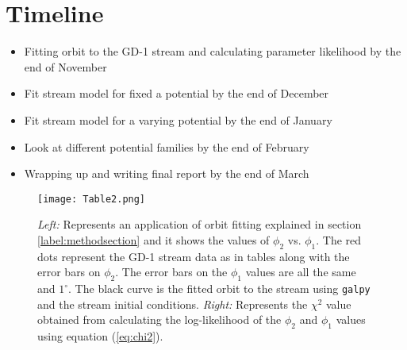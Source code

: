 \documentclass[preprint]{aastex}
\begin{document}
\section{Timeline}
\begin{itemize}
\item Fitting orbit to the GD-1 stream and calculating parameter likelihood by the end of November
\item Fit stream model for fixed a potential by the end of December
\item Fit stream model for a varying potential by the end of January
\item Look at different potential families by the end of February
\item Wrapping up and writing final report by the end of March
\end{itemize}

\newpage

\FloatBarrier
\begin{figure}[H] \label{label:fig1}
\centering
\texttt{[image: Table2.png]}
\caption{\textit{Left:} Represents an application of orbit fitting explained in section \ref{label:methodsection} and it shows the values of $\phi_2$ vs. $\phi_1$. The red dots represent the GD-1 stream data as in \citet{koposov} tables along with the error bars on $\phi_2$. The error bars on the $\phi_1$ values are all the same and $1 ^\circ{}$. The black curve is the fitted orbit to the stream using \texttt{galpy} and the stream initial conditions. \textit{Right:} Represents the $\chi^2$ value obtained from calculating the log-likelihood of the $\phi_2$ and $\phi_1$ values using equation (\ref{eq:chi2}).}
\end{figure}
\FloatBarrier


\end{document}
